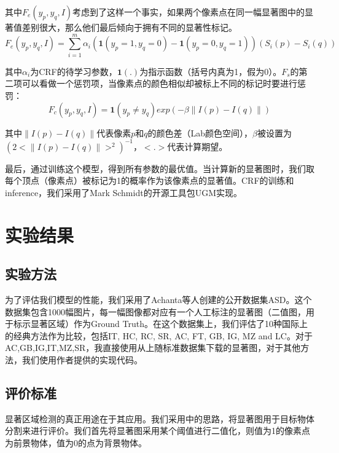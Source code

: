 其中$F_e(y_p,y_q,I)$考虑到了这样一个事实，如果两个像素点在同一幅显著图中的显著值差别很大，那么他们最后倾向于拥有不同的显著性标记。
\begin{equation}
  F_e(y_p,y_q,I) = \sum_{i=1}^{m}\alpha_i(\textbf{1}(y_p=1,y_q=0)-\textbf{1}(y_p=0,y_q=1))(S_i(p)-S_i(q))
\end{equation}

其中$\alpha_i$为CRF的待学习参数，$\textbf{1}(.)$为指示函数（括号内真为1，假为0）。$F_s$的第二项可以看做一个惩罚项，当像素点的颜色相似却被标上不同的标记时要进行惩罚：
\begin{equation}
F_c(y_p,y_q,I)=\textbf{1}(y_p \not= y_q) exp(-\beta \parallel I(p)-I(q) \parallel )
\end{equation}

其中$\parallel I(p)-I(q) \parallel$代表像素$p$和$q$的颜色差（Lab颜色空间），$\beta$被设置为$(2<\parallel I(p)-I(q) \parallel>^2)^{-1}$，$<.>$代表计算期望。

最后，通过训练这个模型，得到所有参数的最优值。当计算新的显著图时，我们取每个顶点（像素点）被标记为1的概率作为该像素点的显著值。CRF的训练和inference，我们采用了Mark Schmidt的开源工具包UGM\cite{UGM_software}实现。

\section{实验结果}
\subsection{实验方法}
为了评估我们模型的性能，我们采用了Achanta等人创建的公开数据集ASD\cite{achanta2009frequency}。这个数据集包含1000幅图片，每一幅图像都对应有一个人工标注的显著图（二值图，用于标示显著区域）作为Ground Truth。在这个数据集上，我们评估了10种国际上的经典方法作为比较，包括IT\cite{itti1998model}, HC\cite{cheng2011global}, RC\cite{cheng2011global}, SR\cite{hou2007saliency}, AC\cite{achanta2008salient}, FT\cite{achanta2009frequency}, GB\cite{harel2006graph}, IG\cite{achanta2009frequency}, MZ\cite{ma2003contrast} and LC\cite{zhai2006visual}。对于AC,GB,IG,IT,MZ,SR，我直接使用从\cite{achanta2009frequency}上随标准数据集下载的显著图，对于其他方法，我们使用作者提供的实现代码。

\subsection{评价标准}
显著区域检测的真正用途在于其应用。我们采用\cite{achanta2009frequency}中的思路，将显著图用于目标物体分割来进行评价。我们首先将显著图采用某个阈值进行二值化，则值为1的像素点为前景物体，值为0的点为背景物体。

